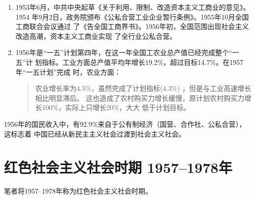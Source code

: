 \begin{enumerate}
\item 1953年6月，中共中央起草《关于利用、限制、改造资本主义工商业的意见》。1954
  年9月2日，政务院颁布《公私合营工业企业暂行条例》。1955年10月全国工商联合会议通过
  了《告全国工商界书》。1956年初，全国范围出现社会主义改造高潮，资本主义工商业实现
  了全行业公私合营。




\item 1956年是``一五''计划第四年，在这一年全国工农业总产值已经完成整个``一五''计
  划指标。工业方面总产值平均年增长19.2\%，超过目标14.7\%。在1957年``一五计划''完成
  时，农业方面：
  \begin{quotation}
    农业增长率为4.5\%，虽然完成了计划指标(4.3\%) ，但是与工业高速增长相比明显滞后。
    这也造成了农村购买力增长缓慢，原计划农村购买力增长100\%，实际上只增长20\%，大大
    低于计划目标。\cite{shiyiwu}
  \end{quotation}

\end{enumerate}

1956年的国民收入中，有92.9\%来自于公有制经济（国营、合作社、公私合营），这标志着
中国已经从新民主主义社会过渡到社会主义社会。

\section{红色社会主义社会时期 1957--1978年}


笔者将1957--1978年称为红色社会主义社会时期。


